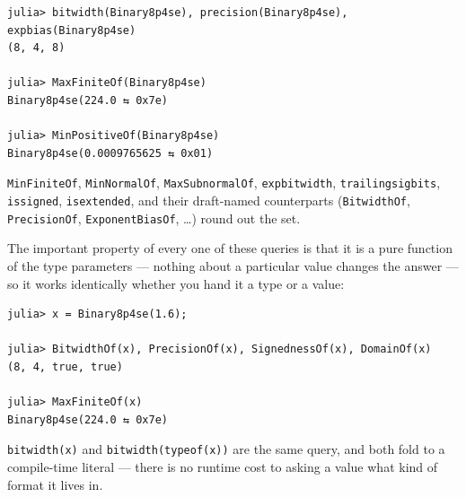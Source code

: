 \nopagebreak[4]
\begin{verbatim}
julia> bitwidth(Binary8p4se), precision(Binary8p4se), expbias(Binary8p4se)
(8, 4, 8)

julia> MaxFiniteOf(Binary8p4se)
Binary8p4se(224.0 ⇆ 0x7e)

julia> MinPositiveOf(Binary8p4se)
Binary8p4se(0.0009765625 ⇆ 0x01)
\end{verbatim}



\texttt{MinFiniteOf}, \texttt{MinNormalOf}, \texttt{MaxSubnormalOf}, \texttt{expbitwidth}, \texttt{trailingsigbits}, \texttt{issigned}, \texttt{isextended}, and their draft-named counterparts (\texttt{BitwidthOf}, \texttt{PrecisionOf}, \texttt{ExponentBiasOf}, …) round out the set.



The important property of every one of these queries is that it is a pure function of the type parameters — nothing about a particular value changes the answer — so it works identically whether you hand it a type or a value:




\nopagebreak[4]
\begin{verbatim}
julia> x = Binary8p4se(1.6);

julia> BitwidthOf(x), PrecisionOf(x), SignednessOf(x), DomainOf(x)
(8, 4, true, true)

julia> MaxFiniteOf(x)
Binary8p4se(224.0 ⇆ 0x7e)
\end{verbatim}



\texttt{bitwidth(x)} and \texttt{bitwidth(typeof(x))} are the same query, and both fold to a compile-time literal — there is no runtime cost to asking a value what kind of format it lives in.




